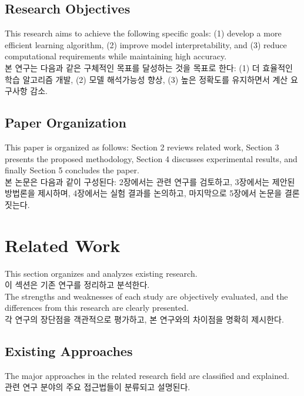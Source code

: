 \documentclass[preprint,12pt]{elsarticle}
\begin{document}
\subsection{Research Objectives}
This research aims to achieve the following specific goals: (1) develop a more efficient learning algorithm, (2) improve model interpretability, and (3) reduce computational requirements while maintaining high accuracy. \\
본 연구는 다음과 같은 구체적인 목표를 달성하는 것을 목표로 한다: (1) 더 효율적인 학습 알고리즘 개발, (2) 모델 해석가능성 향상, (3) 높은 정확도를 유지하면서 계산 요구사항 감소. \\

\subsection{Paper Organization}
This paper is organized as follows: Section 2 reviews related work, Section 3 presents the proposed methodology, Section 4 discusses experimental results, and finally Section 5 concludes the paper. \\
본 논문은 다음과 같이 구성된다: 2장에서는 관련 연구를 검토하고, 3장에서는 제안된 방법론을 제시하며, 4장에서는 실험 결과를 논의하고, 마지막으로 5장에서 논문을 결론짓는다. \\

\section{Related Work}
\label{sec:related_work}

This section organizes and analyzes existing research. \\
이 섹션은 기존 연구를 정리하고 분석한다. \\

The strengths and weaknesses of each study are objectively evaluated, and the differences from this research are clearly presented. \\
각 연구의 장단점을 객관적으로 평가하고, 본 연구와의 차이점을 명확히 제시한다. \\

\subsection{Existing Approaches}
The major approaches in the related research field are classified and explained. \\
관련 연구 분야의 주요 접근법들이 분류되고 설명된다. \\
\end{document}
